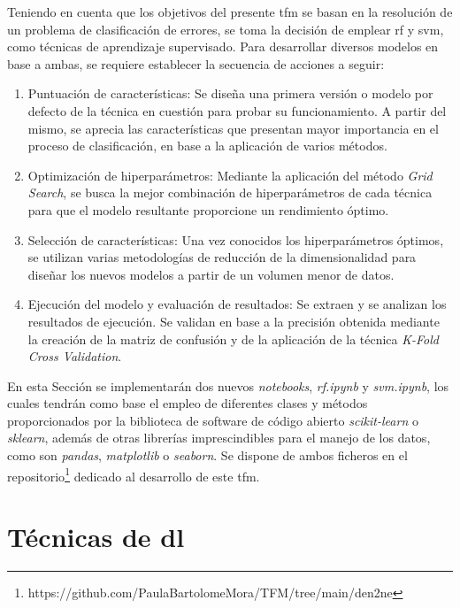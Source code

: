 Teniendo en cuenta que los objetivos del presente \gls{tfm} se basan en la resolución de un problema de clasificación de errores, se toma la decisión de emplear \gls{rf} y \gls{svm}, como técnicas de aprendizaje supervisado. Para desarrollar diversos modelos en base a ambas, se requiere establecer la  secuencia de acciones a seguir: 

\begin{enumerate}
    \item Puntuación de características: Se diseña una primera versión o modelo por defecto de la técnica en cuestión para probar su funcionamiento. A partir del mismo, se aprecia las características que presentan mayor importancia en el proceso de clasificación, en base a la aplicación de varios métodos. 
    \item Optimización de hiperparámetros: Mediante la aplicación del método \textit{Grid Search}, se busca la mejor combinación de hiperparámetros de cada técnica para que el modelo resultante proporcione un rendimiento óptimo. 
    \item Selección de características: Una vez conocidos los hiperparámetros óptimos, se utilizan varias metodologías de reducción de la dimensionalidad para diseñar los nuevos modelos a partir de un volumen menor de datos.
    \item Ejecución del modelo y evaluación de resultados: Se extraen y se analizan los resultados de ejecución. Se validan en base a la precisión obtenida mediante la creación de la matriz de confusión y de la aplicación de la técnica \textit{K-Fold Cross Validation}.
\end{enumerate}

En esta Sección se implementarán dos nuevos \textit{notebooks}, \textit{rf.ipynb} y \textit{svm.ipynb}, los cuales tendrán como base el empleo de diferentes clases y métodos proporcionados por la biblioteca de software de código abierto \textit{scikit-learn} o \textit{sklearn}, además de otras librerías imprescindibles para el manejo de los datos, como son \textit{pandas}, \textit{matplotlib} o \textit{seaborn}. Se dispone de ambos ficheros en el repositorio\footnote{https://github.com/PaulaBartolomeMora/TFM/tree/main/den2ne} dedicado al desarrollo de este \gls{tfm}.




\section{Técnicas de \gls{dl}}
\label{sec:tecnicasdl}

